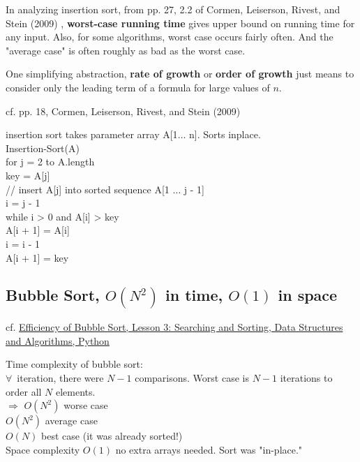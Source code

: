\documentclass[10pt]{amsart}
\begin{document}
\begin{multicols*}{2}
In analyzing insertion sort, from pp. 27, 2.2 of Cormen, Leiserson, Rivest, and Stein (2009) \cite{CLRS2009}, \textbf{worst-case running time} gives upper bound on running time for any input. Also, for some algorithms, worst case occurs fairly often. And the "average case" is often roughly as bad as the worst case.

One simplifying abstraction, \textbf{rate of growth} or \textbf{order of growth} just means to consider only the leading term of a formula for large values of $n$.

cf. pp. 18, Cormen, Leiserson, Rivest, and Stein (2009) \cite{CLRS2009}

insertion sort takes parameter array A[1$\dots$ n]. Sorts inplace. \\

Insertion-Sort(A) \\
for j = 2 to A.length \\
\quad key = A[j] \\
\quad // insert A[j] into sorted sequence A[1 $\dots$ j - 1] \\
\quad i = j - 1\\
\quad while i > 0 and A[i] > key \\
\quad \quad A[i + 1] = A[i] \\
\quad \quad i = i - 1\\
\quad A[i + 1] = key \\

\subsection{Bubble Sort, $O(N^2)$ in time, $O(1)$ in space}

cf. \href{https://classroom.udacity.com/courses/ud513/lessons/7123524086/concepts/71191848070923}{Efficiency of Bubble Sort, Lesson 3: Searching and Sorting, Data Structures and Algorithms, Python}

Time complexity of bubble sort: \\
$\forall \, $ iteration, there were $N-1$ comparisons. Worst case is $N - 1$ iterations to order all $N$ elements. \\
$\Longrightarrow $ $O(N^2)$ worse case \\
\phantom{$\Longrightarrow$} $O(N^2)$ average case \\
\phantom{$\Longrightarrow$} $O(N)$ best case (it was already sorted!) \\

Space complexity $O(1)$ no extra arrays needed. Sort was "in-place."


\end{multicols*}
\end{document}
